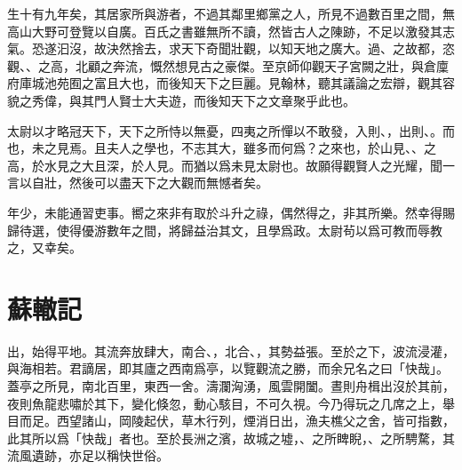 生十有九{年}矣，其居家所與游者，不過其鄰里鄉黨之人，所見不過數百里之間，無高山大野可登覽以自廣。百氏之書雖無所不讀，然皆古人之陳跡，不足以激發其志氣。恐遂汩沒，故決然捨去，求天下奇聞壯觀，以知天地之廣大。過、之故都，恣觀、、之高，北顧之奔流，慨然想見古之豪傑。至京師仰觀天子宮闕之壯，與倉廩府庫城池苑囿之富且大也，而後知天下之巨麗。見翰林，聽其議論之宏辯，觀其容貌之秀偉，與其門人賢士大夫遊，而後知天下之文章聚乎此也。%

太尉以才略冠天下，天下之所恃以無憂，四夷之所憚以不敢發，入則、，出則、。而也，未之見焉。且夫人之學也，不志其大，雖多而何爲？之來也，於山見、、之高，於水見之大且深，於人見。而猶以爲未見太尉也。故願得觀賢人之光耀，聞一言以自壯，然後可以盡天下之大觀而無憾者矣。

年少，未能通習吏事。嚮之來非有取於斗升之祿，偶然得之，非其所樂。然幸得賜歸待選，使得優游數年之間，將{歸}益治其文，且學爲政。太尉茍以爲可教而辱教之，又幸矣。%

\theendnotes

\section[黃州快哉亭記\quad{\small 蘇轍}]{{\normalsize 蘇轍}\quad {}記}
出，始得平地。其流奔放肆大，南合、，北合、，其勢益張。至於之下，波流浸灌，與海相若。君謫居，即其廬之西南爲亭，以覽觀流之勝，而余兄名之曰「快哉」。蓋亭之所見，南北百里，東西一舍。濤瀾洶湧，風雲開闔。晝則舟楫出沒於其前，夜則魚龍悲嘯於其下，變化倏忽，動心駭目，不可久視。今乃得玩之几席之上，舉目而足。西望諸山，岡陵起伏，草木行列，煙消日出，漁夫樵父之舍，皆可指數，此其所以爲「快哉」者也。至於長洲之濱，故城之墟，、之所睥睨，、之所騁騖，其{流風}遺跡，亦足以稱快世俗。%

